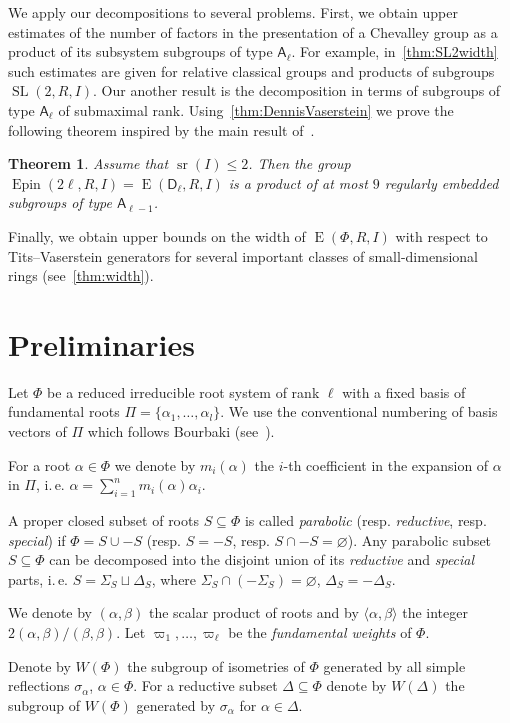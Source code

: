 \documentclass[11pt]{amsart}
\theoremstyle{plain}
\newtheorem{thm}{Theorem}
\numberwithin{equation}{section}
\numberwithin{lemma}{section}
\theoremstyle{definition}
\theoremstyle{remark}
\DeclareMathOperator{\SL}{SL}
\DeclareMathOperator{\E}{E}
\DeclareMathOperator{\sr}{sr}
\DeclareMathOperator{\Epin}{Epin}
\newcommand{\rA}{\mathsf{A}}
\newcommand{\rD}{\mathsf{D}}
\begin{document}
We apply our decompositions to several problems. First, we obtain upper estimates of the number of factors in the presentation of a Chevalley group as a product of its subsystem subgroups of type $\rA_\ell$.
For example, in~\cref{thm:SL2width} such estimates are given for relative classical groups and products of subgroups $\SL(2, R, I)$.
Our another result is the decomposition in terms of subgroups of type $\rA_\ell$ of submaximal rank. 
Using~\cref{thm:DennisVaserstein} we prove the following theorem inspired by the main result of~\cite{Nik07}.
\begin{thm}\label{thm:spin-sln-prod}
Assume that $\sr(I) \leqslant 2$. Then the group $\Epin(2\ell, R, I)=\E(\rD_\ell, R, I)$ is a product of at most $9$ regularly embedded subgroups of type $\rA_{\ell-1}$.
\end{thm}

Finally, we obtain upper bounds on the width of $\E(\Phi, R, I)$ with respect to Tits--Vaserstein generators for several important classes of small-dimensional rings (see~\cref{thm:width}). 

\section{Preliminaries}\label{sec:preliminaries}
Let $\Phi$ be a reduced irreducible root system of rank $\ell$ with a fixed basis of fundamental roots $\Pi=\{\alpha_1, \ldots, \alpha_l\}$.
We use the conventional numbering of basis vectors of $\Pi$ which follows Bourbaki (see~\cite[Table~1]{PSV98}).

For a root $\alpha\in\Phi$ we denote by $m_i(\alpha)$ the $i$-th coefficient in the expansion of $\alpha$ in $\Pi$,
 i.\,e. $\alpha = \sum_{i=1}^n m_i(\alpha) \alpha_i$.

A proper closed subset of roots $S\subseteq \Phi$ is called {\it parabolic} (resp. {\it reductive}, resp. {\it special}) if $\Phi=S \cup -S$ (resp. $S = -S$, resp. $S \cap -S=\varnothing$).
Any parabolic subset $S \subseteq \Phi$ can be decomposed into the disjoint union of its \emph{reductive} and \emph{special} parts, i.\,e. 
$S = \Sigma_S \sqcup \Delta_S$, where $\Sigma_S \cap (-\Sigma_S) = \varnothing$, $\Delta_S = -\Delta_S$.

We denote by $(\alpha, \beta)$ the scalar product of roots and by $\langle \alpha, \beta\rangle$ the integer $2(\alpha, \beta)/(\beta, \beta)$.
Let $\varpi_1, \ldots, \varpi_\ell$ be the \emph{fundamental weights }of $\Phi$.

Denote by $W(\Phi)$ the subgroup of isometries of $\Phi$ generated by all simple reflections $\sigma_\alpha$, $\alpha\in\Phi$.
For a reductive subset $\Delta\subseteq \Phi$ denote by $W(\Delta)$ the subgroup of $W(\Phi)$ generated by $\sigma_\alpha$ for $\alpha\in\Delta$.
\end{document}
